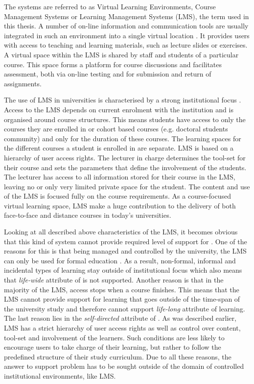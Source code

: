 The systems are referred to as Virtual Learning Environments, Course Management
Systems or Learning Management Systems (LMS), the term used in this thesis. A
number of on-line information and communication tools are usually integrated in
such an environment into a single virtual location \citep{Morgan-Klein2007}. It
provides users with access to teaching and learning materials, such as lecture
slides or exercises. A virtual space within the LMS is shared by staff and
students of a particular course. This space forms a platform for course
discussions and facilitates assessment, both via on-line testing and for
submission and return of assignments.

The use of LMS in universities is characterised by a strong institutional focus
\citep{Siemens2004}. Access to the LMS depends on current enrolment with the
institution and is organised around course structures. This means students have
access to only the courses they are enrolled in or cohort based courses (e.g.
doctoral students community) and only for the duration of these courses. The
learning spaces for the different courses a student is enrolled in are separate.
LMS is based on a hierarchy of user access rights. The lecturer in charge
determines the tool-set for their course and sets the parameters that define the
involvement of the students. The lecturer has access to all information stored
for their course in the LMS, leaving no or only very limited private space for
the student. The content and use of the LMS is focused fully on the course
requirements. As a course-focused virtual learning space, LMS make a huge
contribution to the delivery of both face-to-face and distance courses in
today's universities.

Looking at all described above characteristics of the LMS, it becomes obvious
that this kind of system cannot provide required level of support for \LLLsn.
One of the reasons for this is that being managed and controlled by the
university, the LMS can only be used for formal education \citep{Venable2011}.
As a result, non-formal, informal and incidental types of learning stay outside
of institutional focus which also means that \textit{life-wide} attribute of
\LLLs is not supported. Another reason is that in the majority of the LMS,
access stops when a course finishes. This means that the LMS cannot provide
support for learning that goes outside of the time-span of the university study
and therefore cannot support \textit{life-long} attribute of learning. The last
reason lies in the \textit{self-directed} attribute of \LLLsn. As was described
earlier, LMS has a strict hierarchy of user access rights as well as control
over content, tool-set and involvement of the learners. Such conditions are
less likely to encourage users to take charge of their learning, but rather to
follow the predefined structure of their study curriculum. Due to all these
reasons, the answer to \LLLs support problem has to be sought outside of the
domain of controlled institutional environments, like LMS.


